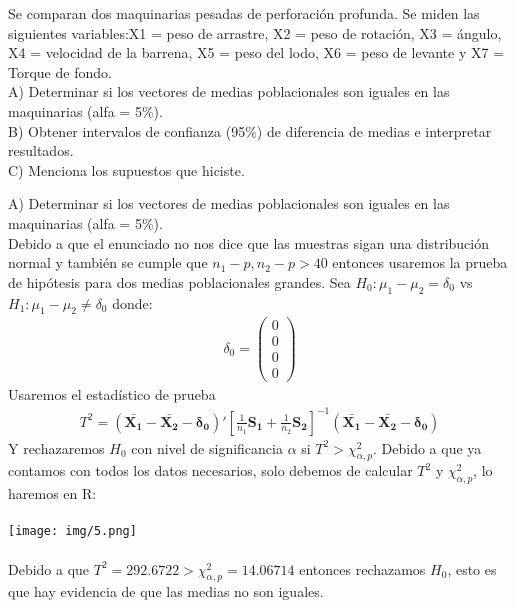 \begin{problem}{2}
Se comparan dos maquinarias pesadas de perforación profunda. Se miden las siguientes variables:X1 = peso de arrastre, X2 = peso de rotación, X3 = ángulo, X4 = velocidad de la barrena,
X5 = peso del lodo, X6 = peso de levante y X7 = Torque de fondo.\\
A) Determinar si los vectores de medias poblacionales son iguales en las maquinarias (alfa = 5\%).\\
B) Obtener intervalos de confianza (95\%) de diferencia de medias e interpretar resultados.\\
C) Menciona los supuestos que hiciste.
\end{problem}
\begin{sol}
A) Determinar si los vectores de medias poblacionales son iguales en las maquinarias (alfa = 5\%).\\
Debido a que el enunciado no nos dice que las muestras sigan una distribución normal y también se cumple que $n_1-p,n_2-p>40$ entonces usaremos la prueba de hipótesis para dos medias poblacionales grandes.
Sea $H_0:\mu_1-\mu_2 = \delta_0$ vs $H_1: \mu_1 - \mu_2
\neq \delta_0$ donde:
\begin{align*}
\delta_0 = \begin{pmatrix}
0\\0\\0\\0
\end{pmatrix}
\end{align*}
Usaremos el estadístico de prueba
\begin{align*}
T^2 = (\bm{\bar{X_1}-\bar{X_2}-\delta_0})' \left[ \frac{1}{n_1}\bm{S_1}+\frac{1}{n_2}\bm{S_2} \right] ^{-1} (\bm{\bar{X_1}-\bar{X_2}-\delta_0})
\end{align*}
Y rechazaremos $H_0$ con nivel de significancia $\alpha$ si $T^2 > \chi_{\alpha, p}^2$. Debido a que ya contamos con todos los datos necesarios, solo debemos de calcular $T^2$ y $ \chi_{\alpha, p}^2$, lo haremos en R:\\\\
\texttt{[image: img/5.png]}\\\\
Debido a que $T^2=292.6722 > \chi_{\alpha, p}^2=14.06714$ entonces rechazamos $H_0$, esto es que hay evidencia de que las medias no son iguales.


\end{sol}

